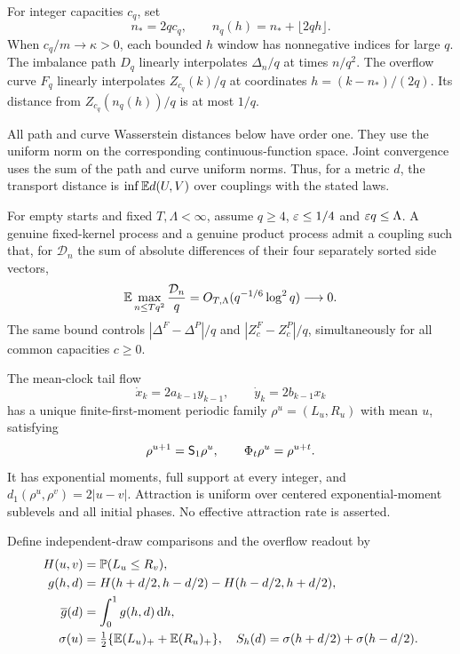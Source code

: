 For integer capacities $c_q$, set
\[
 n_*=2qc_q,\qquad n_q(h)=n_*+\lfloor2qh\rfloor.
\]
When $c_q/m\to\kappa>0$, each bounded $h$ window has nonnegative indices for large $q$.
The imbalance path $D_q$ linearly interpolates $\Delta_n/q$ at times $n/q^2$.
The overflow curve $F_q$ linearly interpolates $Z_{c_q}(k)/q$ at coordinates
$h=(k-n_*)/(2q)$. Its distance from $Z_{c_q}(n_q(h))/q$ is at most $1/q$.

All path and curve Wasserstein distances below have order one. They use the uniform norm on the corresponding continuous-function space. Joint convergence uses the sum of the path and curve uniform norms. Thus, for a metric $d$, the transport distance is $\inf\mathbb E d(U,V)$ over couplings with the stated laws.

\begin{theorem}\label{thm:universal}
For empty starts and fixed $T,\Lambda<\infty$, assume $q\ge4$, $\varepsilon\le1/4$ and $\varepsilon q\le\Lambda$. A genuine fixed-kernel process and a genuine product process admit a coupling such that, for $\mathcal D_n$ the sum of absolute differences of their four separately sorted side vectors,
\[
 \mathbb E\max_{n\le Tq^2}\frac{\mathcal D_n}{q}
 =O_{T,\Lambda}(q^{-1/6}\log^2q)\longrightarrow0.
\]
The same bound controls $|\Delta^F-\Delta^P|/q$ and $|Z_c^F-Z_c^P|/q$, simultaneously for all common capacities $c\ge0$.
\end{theorem}

\begin{theorem}\label{thm:profile}
The mean-clock tail flow
\begin{equation}\label{eq:flow}
 \dot x_k=2a_{k-1}y_{k-1},\qquad
 \dot y_k=2b_{k-1}x_k
\end{equation}
has a unique finite-first-moment periodic family $\rho^u=(L_u,R_u)$ with mean $u$, satisfying
\[
 \rho^{u+1}=\mathsf S_1\rho^u,\qquad \Phi_t\rho^u=\rho^{u+t}.
\]
It has exponential moments, full support at every integer, and
$d_1(\rho^u,\rho^v)=2|u-v|$. Attraction is uniform over centered exponential-moment sublevels and all initial phases. No effective attraction rate is asserted.
\end{theorem}

Define independent-draw comparisons and the overflow readout by
\begin{align}
 H(u,v)&=\mathbb P(L_u\le R_v),\nonumber\\
 g(h,d)&=H(h+d/2,h-d/2)-H(h-d/2,h+d/2),\label{eq:g}\\
 \overline g(d)&=\int_0^1g(h,d)\,\mathrm d h,\nonumber\\
 \sigma(u)&=\tfrac12\{\mathbb E(L_u)_++\mathbb E(R_u)_+\},\quad
 S_h(d)=\sigma(h+d/2)+\sigma(h-d/2).\label{eq:spill}
\end{align}

